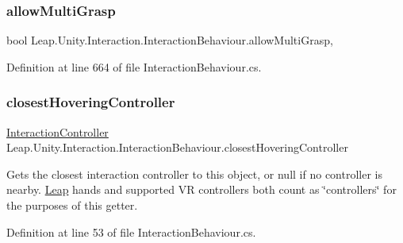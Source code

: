 \subsubsection{\texorpdfstring{allowMultiGrasp}{allowMultiGrasp}}
{\footnotesize\ttfamily bool Leap.\+Unity.\+Interaction.\+Interaction\+Behaviour.\+allow\+Multi\+Grasp\hspace{0.3cm}{\ttfamily [get]}, {\ttfamily [set]}}



Definition at line 664 of file Interaction\+Behaviour.\+cs.

\mbox{\label{class_leap_1_1_unity_1_1_interaction_1_1_interaction_behaviour_af6a50b78ed79f3e69a2ce6b228319563}} 
\subsubsection{\texorpdfstring{closestHoveringController}{closestHoveringController}}
{\footnotesize\ttfamily \mbox{\hyperlink{class_leap_1_1_unity_1_1_interaction_1_1_interaction_controller}{Interaction\+Controller}} Leap.\+Unity.\+Interaction.\+Interaction\+Behaviour.\+closest\+Hovering\+Controller\hspace{0.3cm}{\ttfamily [get]}}



Gets the closest interaction controller to this object, or null if no controller is nearby. \mbox{\hyperlink{namespace_leap_1_1_unity_1_1_leap}{Leap}} hands and supported VR controllers both count as \char`\"{}controllers\char`\"{} for the purposes of this getter. 



Definition at line 53 of file Interaction\+Behaviour.\+cs.

\mbox{\label{class_leap_1_1_unity_1_1_interaction_1_1_interaction_behaviour_aefe390893dcb760876ebf2ad2da4ccb2}} 
